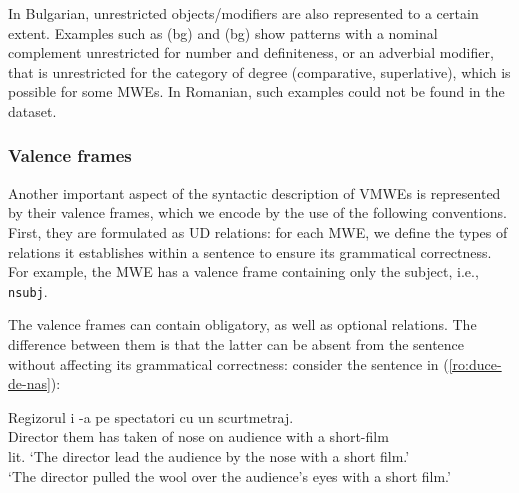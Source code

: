 \documentclass[output=paper,colorlinks,citecolor=brown]{langscibook}
\begin{document}
In Bulgarian, unrestricted objects/modifiers are also represented to a certain extent. Examples such as (bg)  and (bg)  show patterns with a nominal complement unrestricted for number and definiteness, or an adverbial modifier, that is unrestricted for the category of degree (comparative, superlative), which is possible for some MWEs. In Romanian, such examples could not be found in the dataset. 



\subsubsection{Valence frames}\label{valence-frames} 
Another important aspect of the syntactic description of VMWEs is represented by their valence frames, which we encode by the use of the following conventions. First, they are formulated as UD relations: for each MWE, we define the types of relations it establishes within a sentence to ensure its grammatical correctness. For example, the MWE  has a valence frame containing only the subject, i.e., \texttt{nsubj}.

The valence frames can contain obligatory, as well as optional relations. The difference between them is that the latter can be absent from the sentence without affecting its grammatical correctness: consider the sentence in (\ref{ro:duce-de-nas}):

\ea \label{ro:duce-de-nas}
\settowidth {}
\gll Regizorul i -a    pe spectatori cu un scurtmetraj. \\
Director them has taken of nose on audience with a short-film \\ 
\glt lit. `The director lead the audience by the nose with a short film.' \\
`The director pulled the wool over the audience's eyes with a short film.' \\
\z
\end{document}
